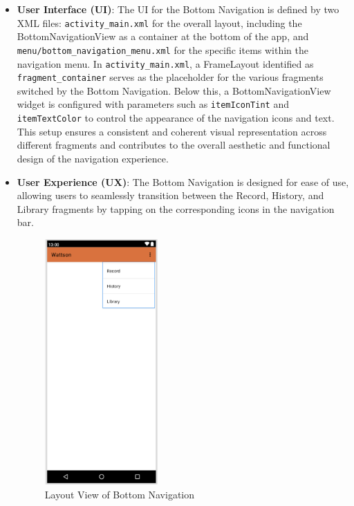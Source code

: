 \documentclass[conference,10pt,letterpaper]{IEEEtran}
\begin{document}
	\begin{itemize}
		
		\item \textbf{User Interface (UI)}:
	    The UI for the Bottom Navigation is defined by two XML files: \texttt{activity\_main.xml} for the overall layout, including the BottomNavigationView as a container at the bottom of the app, and \texttt{menu/bottom\_navigation\_menu.xml} for the specific items within the navigation menu. In \texttt{activity\_main.xml}, a FrameLayout identified as \texttt{fragment\_container} serves as the placeholder for the various fragments switched by the Bottom Navigation. Below this, a BottomNavigationView widget is configured with parameters such as \texttt{itemIconTint} and \texttt{itemTextColor} to control the appearance of the navigation icons and text. This setup ensures a consistent and coherent visual representation across different fragments and contributes to the overall aesthetic and functional design of the navigation experience.
		
		\item \textbf{User Experience (UX)}:
		The Bottom Navigation is designed for ease of use, allowing users to seamlessly transition between the Record, History, and Library fragments by tapping on the corresponding icons in the navigation bar.
		
		\begin{figure}[htbp]
			\centerline{\includegraphics[width=1.7in]{src/menu.png}}
			\caption{Layout View of Bottom Navigation}
			\label{fig:menu}
		\end{figure}
		

\end{itemize}
\end{document}
